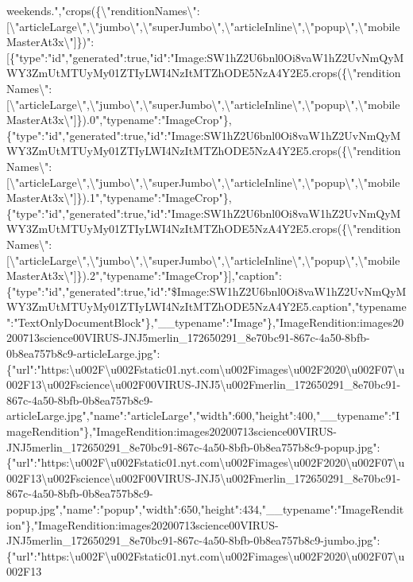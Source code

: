 weekends.","crops(\{\textbackslash{}"renditionNames\textbackslash{}":{[}\textbackslash{}"articleLarge\textbackslash{}",\textbackslash{}"jumbo\textbackslash{}",\textbackslash{}"superJumbo\textbackslash{}",\textbackslash{}"articleInline\textbackslash{}",\textbackslash{}"popup\textbackslash{}",\textbackslash{}"mobileMasterAt3x\textbackslash{}"{]}\})":{[}\{"type":"id","generated":true,"id":"Image:SW1hZ2U6bnl0Oi8vaW1hZ2UvNmQyMWY3ZmUtMTUyMy01ZTIyLWI4NzItMTZhODE5NzA4Y2E5.crops(\{\textbackslash{}"renditionNames\textbackslash{}":{[}\textbackslash{}"articleLarge\textbackslash{}",\textbackslash{}"jumbo\textbackslash{}",\textbackslash{}"superJumbo\textbackslash{}",\textbackslash{}"articleInline\textbackslash{}",\textbackslash{}"popup\textbackslash{}",\textbackslash{}"mobileMasterAt3x\textbackslash{}"{]}\}).0","typename":"ImageCrop"\},\{"type":"id","generated":true,"id":"Image:SW1hZ2U6bnl0Oi8vaW1hZ2UvNmQyMWY3ZmUtMTUyMy01ZTIyLWI4NzItMTZhODE5NzA4Y2E5.crops(\{\textbackslash{}"renditionNames\textbackslash{}":{[}\textbackslash{}"articleLarge\textbackslash{}",\textbackslash{}"jumbo\textbackslash{}",\textbackslash{}"superJumbo\textbackslash{}",\textbackslash{}"articleInline\textbackslash{}",\textbackslash{}"popup\textbackslash{}",\textbackslash{}"mobileMasterAt3x\textbackslash{}"{]}\}).1","typename":"ImageCrop"\},\{"type":"id","generated":true,"id":"Image:SW1hZ2U6bnl0Oi8vaW1hZ2UvNmQyMWY3ZmUtMTUyMy01ZTIyLWI4NzItMTZhODE5NzA4Y2E5.crops(\{\textbackslash{}"renditionNames\textbackslash{}":{[}\textbackslash{}"articleLarge\textbackslash{}",\textbackslash{}"jumbo\textbackslash{}",\textbackslash{}"superJumbo\textbackslash{}",\textbackslash{}"articleInline\textbackslash{}",\textbackslash{}"popup\textbackslash{}",\textbackslash{}"mobileMasterAt3x\textbackslash{}"{]}\}).2","typename":"ImageCrop"\}{]},"caption":\{"type":"id","generated":true,"id":"\$Image:SW1hZ2U6bnl0Oi8vaW1hZ2UvNmQyMWY3ZmUtMTUyMy01ZTIyLWI4NzItMTZhODE5NzA4Y2E5.caption","typename":"TextOnlyDocumentBlock"\},"\_\_typename":"Image"\},"ImageRendition:images20200713science00VIRUS-JNJ5merlin\_172650291\_8e70bc91-867c-4a50-8bfb-0b8ea757b8c9-articleLarge.jpg":\{"url":"https:\textbackslash{}u002F\textbackslash{}u002Fstatic01.nyt.com\textbackslash{}u002Fimages\textbackslash{}u002F2020\textbackslash{}u002F07\textbackslash{}u002F13\textbackslash{}u002Fscience\textbackslash{}u002F00VIRUS-JNJ5\textbackslash{}u002Fmerlin\_172650291\_8e70bc91-867c-4a50-8bfb-0b8ea757b8c9-articleLarge.jpg","name":"articleLarge","width":600,"height":400,"\_\_typename":"ImageRendition"\},"ImageRendition:images20200713science00VIRUS-JNJ5merlin\_172650291\_8e70bc91-867c-4a50-8bfb-0b8ea757b8c9-popup.jpg":\{"url":"https:\textbackslash{}u002F\textbackslash{}u002Fstatic01.nyt.com\textbackslash{}u002Fimages\textbackslash{}u002F2020\textbackslash{}u002F07\textbackslash{}u002F13\textbackslash{}u002Fscience\textbackslash{}u002F00VIRUS-JNJ5\textbackslash{}u002Fmerlin\_172650291\_8e70bc91-867c-4a50-8bfb-0b8ea757b8c9-popup.jpg","name":"popup","width":650,"height":434,"\_\_typename":"ImageRendition"\},"ImageRendition:images20200713science00VIRUS-JNJ5merlin\_172650291\_8e70bc91-867c-4a50-8bfb-0b8ea757b8c9-jumbo.jpg":\{"url":"https:\textbackslash{}u002F\textbackslash{}u002Fstatic01.nyt.com\textbackslash{}u002Fimages\textbackslash{}u002F2020\textbackslash{}u002F07\textbackslash{}u002F13\textbacks